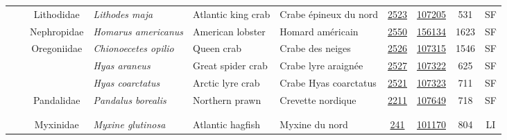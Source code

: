 \documentclass[12pt]{article}\usepackage[]{graphicx}\usepackage[]{color}
\begin{document}
\begin{landscapepage}
\begin{longtable}[t]{ccc>{\centering\arraybackslash}p{3cm}>{\centering\arraybackslash}p{3cm}>{\centering\arraybackslash}p{3cm}>{}c>{}ccc}
\hspace{1em}\hspace{1em} &  & Lithodidae & \em{Lithodes maja} & Atlantic king crab & Crabe épineux du nord & \href{#sec:2511}{2523} & \href{http://www.marinespecies.org/aphia.php?p=taxdetails&id=158056}{107205} & 531 & SF\\
\hspace{1em}\hspace{1em} &  & Nephropidae & \em{Homarus americanus} & American lobster & Homard américain & \href{#sec:2513}{2550} & \href{http://www.marinespecies.org/aphia.php?p=taxdetails&id=158057}{156134} & 1623 & SF\\
\hspace{1em}\hspace{1em} &  & Oregoniidae & \em{Chionoecetes opilio} & Queen crab & Crabe des neiges & \href{#sec:2521}{2526} & \href{http://www.marinespecies.org/aphia.php?p=taxdetails&id=107323}{107315} & 1546 & SF\\
\hspace{1em}\hspace{1em} &  &  & \em{Hyas araneus} & Great spider crab & Crabe lyre araignée & \href{#sec:2523}{2527} & \href{http://www.marinespecies.org/aphia.php?p=taxdetails&id=107205}{107322} & 625 & SF\\
\hspace{1em}\hspace{1em} &  &  & \em{Hyas coarctatus} & Arctic lyre crab & Crabe Hyas coarctatus & \href{#sec:2526}{2521} & \href{http://www.marinespecies.org/aphia.php?p=taxdetails&id=107315}{107323} & 711 & SF\\
\hspace{1em}\hspace{1em} &  & Pandalidae & \em{Pandalus borealis} & Northern prawn & Crevette nordique & \href{#sec:2527}{2211} & \href{http://www.marinespecies.org/aphia.php?p=taxdetails&id=107322}{107649} & 718 & SF\\
\addlinespace[0.3em]
\\
\addlinespace[0.3em]
\\
\hspace{1em}\hspace{1em} &  & Myxinidae & \em{Myxine glutinosa} & Atlantic hagfish & Myxine du nord & \href{#sec:2532}{241} & \href{http://www.marinespecies.org/aphia.php?p=taxdetails&id=158407}{101170} & 804 & LI\\

\end{longtable}
\end{landscapepage}
\end{document}
